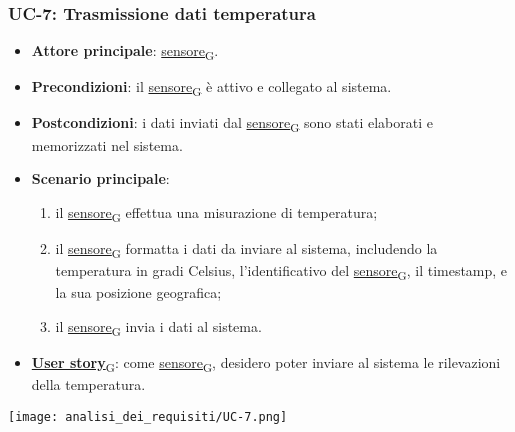 \subsubsection{UC-7: Trasmissione dati temperatura}
\begin{itemize}
	\item \textbf{Attore principale}: \href{https://7last.github.io/docs/pb/documentazione-interna/glossario\#sensore}{sensore\textsubscript{G}}.
	\item \textbf{Precondizioni}: il \href{https://7last.github.io/docs/pb/documentazione-interna/glossario\#sensore}{sensore\textsubscript{G}} è attivo e collegato al sistema.
	\item \textbf{Postcondizioni}: i dati inviati dal \href{https://7last.github.io/docs/pb/documentazione-interna/glossario\#sensore}{sensore\textsubscript{G}} sono stati elaborati e memorizzati nel sistema.
	\item \textbf{Scenario principale}:
	      \begin{enumerate}
		      \item il \href{https://7last.github.io/docs/pb/documentazione-interna/glossario\#sensore}{sensore\textsubscript{G}} effettua una misurazione di temperatura;
		      \item il \href{https://7last.github.io/docs/pb/documentazione-interna/glossario\#sensore}{sensore\textsubscript{G}} formatta i dati da inviare al sistema, includendo la temperatura in gradi Celsius, l'identificativo del \href{https://7last.github.io/docs/pb/documentazione-interna/glossario\#sensore}{sensore\textsubscript{G}},
		            il timestamp, e la sua posizione geografica;
		      \item il \href{https://7last.github.io/docs/pb/documentazione-interna/glossario\#sensore}{sensore\textsubscript{G}} invia i dati al sistema.
	      \end{enumerate}
	\item \href{https://7last.github.io/docs/pb/documentazione-interna/glossario\#user-story}{\textbf{User story}\textsubscript{G}}: come \href{https://7last.github.io/docs/pb/documentazione-interna/glossario\#sensore}{sensore\textsubscript{G}}, desidero poter inviare al sistema le rilevazioni della temperatura.
\end{itemize}
\begin{center}
	\texttt{[image: analisi\_dei\_requisiti/UC-7.png]}
\end{center}

